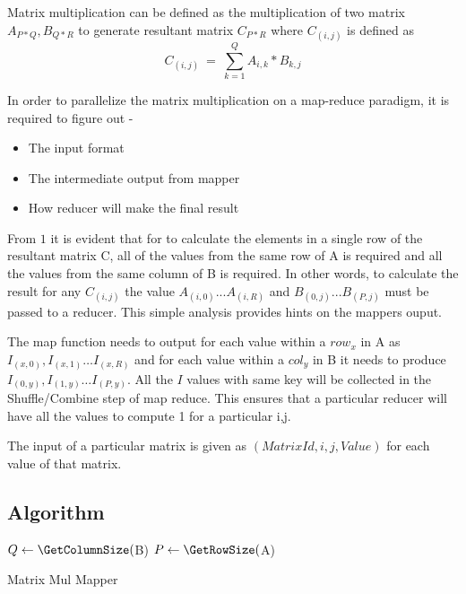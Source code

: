 \documentclass{article}
\begin{document}
Matrix multiplication can be defined as the multiplication of two matrix ${A_{P*Q},B_{Q*R}}$ to generate resultant matrix ${C_{P*R}}$ where ${C_{(i,j)}}$ is defined as  
\begin{equation}
C_{(i,j)}\ =\ \sum_{k = 1}^{Q} A_{i, k} *  B_{k,j}
\end{equation}

In order to parallelize the matrix multiplication on a map-reduce paradigm, it is required to figure out -
\begin{itemize}
\item The input format 
\item The intermediate output from mapper
\item How reducer will make the final result
\end{itemize}

From \(1\) it is evident that for to calculate the elements in a single row of the resultant matrix C, all of the values from the same row of A is required and all the values from the same column of B is required. In other words, to calculate the result for any ${C_{(i,j)}}$ the value ${A_{(i,0)} ...  A_{(i,R)}}$ and ${B_{(0,j)} ... B_{(P,j)}}$  must be passed to a reducer. This simple analysis provides hints on the mappers ouput.

The map function needs to output for each value within a ${row_{x}}$ in A as ${I_{(x, 0)}, I_{(x, 1)} …  I_{(x,R)}}$ and for each value within a ${col_{y}}$ in B it needs to produce ${I_{(0, y)}, I_{(1, y)} …  I_{(P,y)}}$. All the ${I}$ values with same key will be  collected in the Shuffle/Combine step of map reduce. This ensures that a particular reducer will have all the values to compute 1 for a particular i,j.

The input of a particular matrix is given as ${(MatrixId,i,j,Value)}$ for each value of that matrix.

\subsection{Algorithm}
\IncMargin{1em}
\begin{algorithm}[H]
\DontPrintSemicolon
{}
\BlankLine
$Q\leftarrow \GetColumnSize($B)\;
$P\leftarrow \GetRowSize($A)\;
\caption{Matrix Mul Mapper\label{IR}}
\end{algorithm}
\DecMargin{1em}
\end{document}
